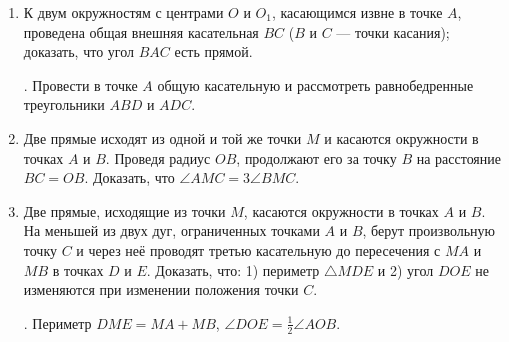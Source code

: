 \documentclass[twoside]{book}
\begin{document}
\begin{enumerate}[resume]
 \item
К двум окружностям с центрами $O$ и $O_1$, касающимся извне в точке $A$, проведена общая внешняя касательная $BC$ ($B$ и $C$ — точки касания);
доказать, что угол $BAC$ есть прямой.

\smallskip
{}.
Провести в точке $A$ общую касательную и рассмотреть равнобедренные треугольники $ABD$ и $ADC$.

 \item
Две прямые исходят из одной и той же точки $M$ и касаются окружности в точках $A$ и $B$.
Проведя радиус $OB$, продолжают его за точку $B$ на расстояние $BC=OB$.
Доказать, что $\angle AMC=3\angle BMC$.

 \item
Две прямые, исходящие из точки $M$, касаются окружности в точках $A$ и $B$.
На меньшей из двух дуг, ограниченных точками $A$ и $B$, берут произвольную точку $C$ и через неё проводят третью касательную до пересечения с $MA$ и $MB$ в точках $D$ и $E$.
Доказать, что:
1) периметр $\triangle MDE$ и 2) угол $DOE$ не изменяются при изменении положения точки $C$.

\smallskip
{}.
Периметр $DME=MA+MB$, $\angle DOE=\tfrac12 \angle AOB$.



\end{enumerate}

\begin{center}
\end{center}
\end{document}

